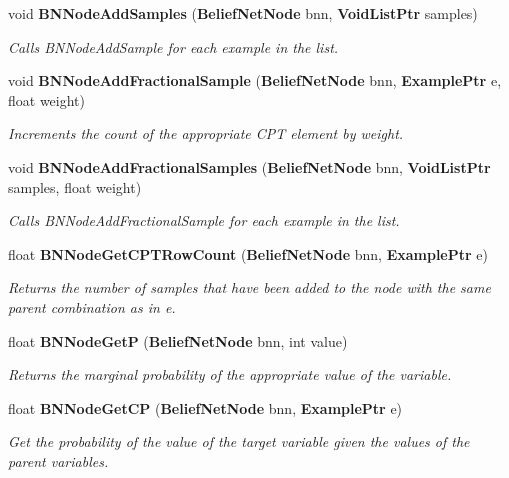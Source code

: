 \begin{CompactItemize}
void {\bf BNNode\-Add\-Samples} ({\bf Belief\-Net\-Node} bnn, {\bf Void\-List\-Ptr} samples)
\begin{CompactList}\small\item\em Calls BNNode\-Add\-Sample for each example in the list. \item\end{CompactList}\item 
void {\bf BNNode\-Add\-Fractional\-Sample} ({\bf Belief\-Net\-Node} bnn, {\bf Example\-Ptr} e, float weight)
\begin{CompactList}\small\item\em Increments the count of the appropriate CPT element by weight. \item\end{CompactList}\item 
void {\bf BNNode\-Add\-Fractional\-Samples} ({\bf Belief\-Net\-Node} bnn, {\bf Void\-List\-Ptr} samples, float weight)
\begin{CompactList}\small\item\em Calls BNNode\-Add\-Fractional\-Sample for each example in the list. \item\end{CompactList}\item 
float {\bf BNNode\-Get\-CPTRow\-Count} ({\bf Belief\-Net\-Node} bnn, {\bf Example\-Ptr} e)
\begin{CompactList}\small\item\em Returns the number of samples that have been added to the node with the same parent combination as in e. \item\end{CompactList}\item 
float {\bf BNNode\-Get\-P} ({\bf Belief\-Net\-Node} bnn, int value)
\begin{CompactList}\small\item\em Returns the marginal probability of the appropriate value of the variable. \item\end{CompactList}\item 
float {\bf BNNode\-Get\-CP} ({\bf Belief\-Net\-Node} bnn, {\bf Example\-Ptr} e)
\begin{CompactList}\small\item\em Get the probability of the value of the target variable given the values of the parent variables. \item\end{CompactList}\item 

\end{CompactItemize}
